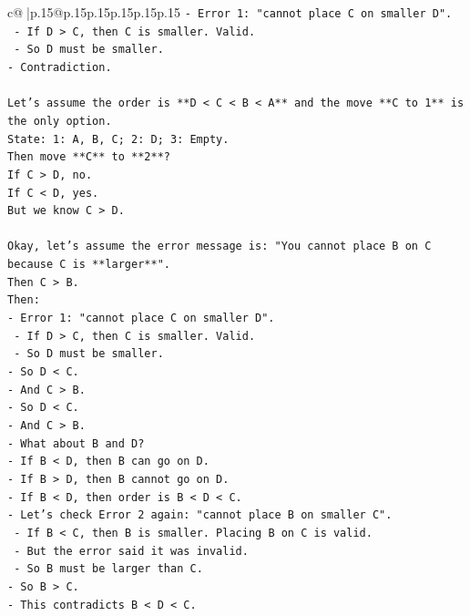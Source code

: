 \documentclass{article}
\begin{document}
{\begin{supertabular}{c@{$\;$}|p{.15\linewidth}@{}p{.15\linewidth}p{.15\linewidth}p{.15\linewidth}p{.15\linewidth}p{.15\linewidth}}
{{{\texttt{{-} Error 1: "cannot place C on smaller D".} \\
\texttt{    {-} If D > C, then C is smaller. Valid.} \\
\texttt{    {-} So D must be smaller.} \\
\texttt{{-} Contradiction.} \\
\\ 
\texttt{Let's assume the order is **D < C < B < A** and the move **C to 1** is the only option.} \\
\texttt{State: 1: A, B, C; 2: D; 3: Empty.} \\
\texttt{Then move **C** to **2**?} \\
\texttt{If C > D, no.} \\
\texttt{If C < D, yes.} \\
\texttt{But we know C > D.} \\
\\ 
\texttt{Okay, let's assume the error message is: "You cannot place B on C because C is **larger**".} \\
\texttt{Then C > B.} \\
\texttt{Then:} \\
\texttt{{-} Error 1: "cannot place C on smaller D".} \\
\texttt{    {-} If D > C, then C is smaller. Valid.} \\
\texttt{    {-} So D must be smaller.} \\
\texttt{{-} So D < C.} \\
\texttt{{-} And C > B.} \\
\texttt{{-} So D < C.} \\
\texttt{{-} And C > B.} \\
\texttt{{-} What about B and D?} \\
\texttt{{-} If B < D, then B can go on D.} \\
\texttt{{-} If B > D, then B cannot go on D.} \\
\texttt{{-} If B < D, then order is B < D < C.} \\
\texttt{{-} Let's check Error 2 again: "cannot place B on smaller C".} \\
\texttt{    {-} If B < C, then B is smaller. Placing B on C is valid.} \\
\texttt{    {-} But the error said it was invalid.} \\
\texttt{    {-} So B must be larger than C.} \\
\texttt{{-} So B > C.} \\
\texttt{{-} This contradicts B < D < C.} \\
}}}
\end{supertabular}}
\end{document}
